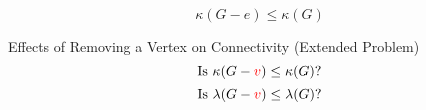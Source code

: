 \begin{frame}{}
  \pause
  \[
    \kappa(G - e) \le \kappa(G)
  \]

  \pause
  \vspace{0.50cm}
  \begin{exampleblock}{Effects of Removing a Vertex on Connectivity (Extended Problem)}
    \[
      \text{Is } \kappa(G - \textcolor{red}{v}) \le \kappa(G)?
    \]
    \[
      \text{Is } \lambda(G - \textcolor{red}{v}) \le \lambda(G)?
    \]
  \end{exampleblock}

  \pause
  \vspace{0.30cm}
\end{frame}
